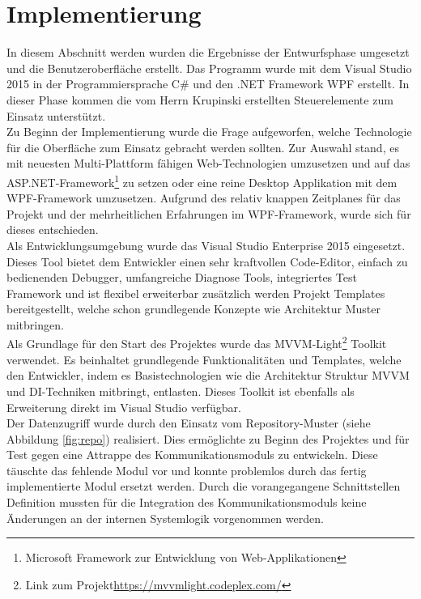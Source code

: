 \section{Implementierung}

In diesem Abschnitt werden wurden die Ergebnisse der Entwurfsphase umgesetzt und die Benutzeroberfläche erstellt. Das Programm wurde mit dem Visual Studio 2015 in der Programmiersprache C\# und den .NET Framework WPF erstellt. In dieser Phase kommen die vom Herrn Krupinski erstellten Steuerelemente zum Einsatz unterstützt.\\

Zu Beginn der Implementierung wurde die Frage aufgeworfen, welche Technologie für die Oberfläche zum Einsatz gebracht werden sollten. Zur Auswahl stand, es mit neuesten Multi-Plattform fähigen Web-Technologien umzusetzen und auf das ASP.NET-Framework\footnote{Microsoft Framework zur Entwicklung von Web-Applikationen} zu setzen oder eine reine Desktop Applikation mit dem WPF-Framework umzusetzen. Aufgrund des relativ knappen Zeitplanes für das Projekt und der mehrheitlichen Erfahrungen im WPF-Framework, wurde sich für dieses entschieden.\\

Als Entwicklungsumgebung wurde das Visual Studio Enterprise 2015 eingesetzt. Dieses Tool bietet dem Entwickler einen sehr kraftvollen Code-Editor, einfach zu bedienenden Debugger, umfangreiche Diagnose Tools, integriertes Test Framework und ist flexibel erweiterbar zusätzlich werden Projekt Templates bereitgestellt, welche schon grundlegende Konzepte wie Architektur Muster mitbringen.\\

Als Grundlage für den Start des Projektes wurde das MVVM-Light\footnote{Link zum Projekt\url{https://mvvmlight.codeplex.com/}} Toolkit verwendet. Es beinhaltet grundlegende Funktionalitäten und Templates, welche den Entwickler, indem es Basistechnologien wie die Architektur Struktur MVVM und DI-Techniken mitbringt, entlasten. Dieses Toolkit ist ebenfalls als Erweiterung direkt im Visual Studio verfügbar.\\

Der Datenzugriff wurde durch den Einsatz vom Repository-Muster (siehe Abbildung \ref{fig:repo}) realisiert. Dies ermöglichte zu Beginn des Projektes und für Test gegen eine Attrappe des Kommunikationsmoduls zu entwickeln. Diese täuschte das fehlende Modul vor und konnte problemlos durch das fertig implementierte Modul ersetzt werden. Durch die vorangegangene Schnittstellen Definition mussten für die Integration des Kommunikationsmoduls keine Änderungen an der internen Systemlogik vorgenommen werden.   


